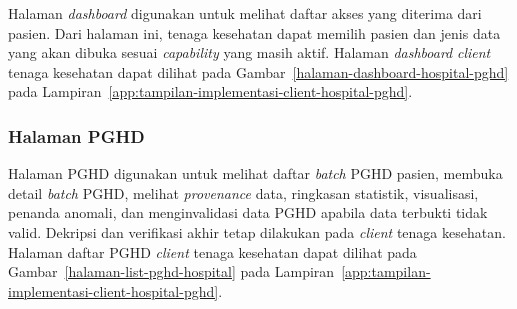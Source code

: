 Halaman \textit{dashboard} digunakan untuk melihat daftar akses yang diterima dari pasien. 
Dari halaman ini, tenaga kesehatan dapat memilih pasien dan jenis data yang akan dibuka sesuai \textit{capability} yang masih aktif.
Halaman \textit{dashboard} \textit{client} tenaga kesehatan dapat dilihat pada Gambar~\ref{halaman-dashboard-hospital-pghd} pada Lampiran~\ref{app:tampilan-implementasi-client-hospital-pghd}.

\subsubsection{Halaman PGHD}

Halaman PGHD digunakan untuk melihat daftar \textit{batch} PGHD pasien, membuka detail \textit{batch} PGHD, melihat \textit{provenance} data, ringkasan statistik, visualisasi, penanda anomali, dan menginvalidasi data PGHD apabila data terbukti tidak valid.
Dekripsi dan verifikasi akhir tetap dilakukan pada \textit{client} tenaga kesehatan.
Halaman daftar PGHD \textit{client} tenaga kesehatan dapat dilihat pada Gambar~\ref{halaman-list-pghd-hospital} pada Lampiran~\ref{app:tampilan-implementasi-client-hospital-pghd}.




